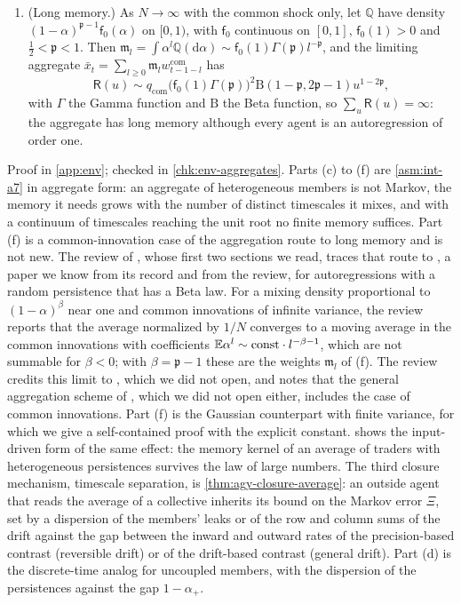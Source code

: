 \begin{proposition}
\begin{enumerate}
\item[(f)] (Long memory.) As $N\to\infty$ with the common shock only, let $\mathbb Q$ have density $(1-\alpha)^{\mathfrak p-1}\mathsf f_0(\alpha)$ on $[0,1)$, with $\mathsf f_0$ continuous on $[0,1]$, $\mathsf f_0(1)>0$ and $\frac12<\mathfrak p<1$. Then $\mathfrak m_l=\int\alpha^l\mathbb Q(\mathrm d\alpha)\sim\mathsf f_0(1)\Gamma(\mathfrak p)l^{-\mathfrak p}$, and the limiting aggregate $\bar x_t=\sum_{l\ge0}\mathfrak m_lw^{\mathrm{com}}_{t-1-l}$ has
\[
\mathsf R(u)\sim q_{\mathrm{com}}\bigl(\mathsf f_0(1)\Gamma(\mathfrak p)\bigr)^2\mathrm B(1-\mathfrak p,2\mathfrak p-1)u^{1-2\mathfrak p},
\]
with $\Gamma$ the Gamma function and $\mathrm B$ the Beta function, so $\sum_u\mathsf R(u)=\infty$: the aggregate has long memory although every agent is an autoregression of order one.
\end{enumerate}
\end{proposition}

Proof in \cref{app:env}; checked in \cref{chk:env-aggregates}. Parts (c) to (f) are \cref{asm:int-a7} in aggregate form: an aggregate of heterogeneous members is not Markov, the memory it needs grows with the number of distinct timescales it mixes, and with a continuum of timescales reaching the unit root no finite memory suffices. Part (f) is a common-innovation case of the aggregation route to long memory and is not new. The review of \citet{leipus2013aggregation}, whose first two sections we read, traces that route to \citet{granger1980long}, a paper we know from its record and from the review, for autoregressions with a random persistence that has a Beta law. For a mixing density proportional to $(1-\alpha)^{\beta}$ near one and common innovations of infinite variance, the review reports that the average normalized by $1/N$ converges to a moving average in the common innovations with coefficients $\mathbb{E}\alpha^l\sim\mathrm{const}\cdot l^{-\beta-1}$, which are not summable for $\beta<0$; with $\beta=\mathfrak p-1$ these are the weights $\mathfrak m_l$ of (f). The review credits this limit to \citet{puplinskaite2009aggregation}, which we did not open, and notes that the general aggregation scheme of \citet{zaffaroni2004contemporaneous}, which we did not open either, includes the case of common innovations. Part (f) is the Gaussian counterpart with finite variance, for which we give a self-contained proof with the explicit constant.  shows the input-driven form of the same effect: the memory kernel of an average of traders with heterogeneous persistences survives the law of large numbers. The third closure mechanism, timescale separation, is \cref{thm:agy-closure-average}: an outside agent that reads the average of a collective inherits its bound on the Markov error $\Xi$, set by a dispersion of the members' leaks or of the row and column sums of the drift against the gap between the inward and outward rates of the precision-based contrast (reversible drift) or of the drift-based contrast (general drift). Part (d) is the discrete-time analog for uncoupled members, with the dispersion of the persistences against the gap $1-\alpha_+$.

